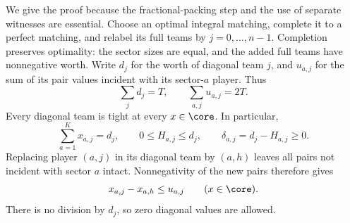 We give the proof because the fractional-packing step and the use of
separate witnesses are essential. Choose an optimal integral matching,
complete it to a perfect matching, and relabel its full teams by
$j=0,\ldots,n-1$. Completion preserves optimality: the sector sizes are
equal, and the added full teams have nonnegative worth. Write $d_j$ for
the worth of diagonal team $j$, and $u_{a,j}$ for the sum of its pair
values incident with its sector-$a$ player. Thus
\begin{equation}\label{four:budgets}
       \sum_j d_j=T,\qquad \sum_{a,j}u_{a,j}=2T.
\end{equation}
Every diagonal team is tight at every $x\in\core$. In particular,
\[
   \sum_{a=1}^Kx_{a,j}=d_j,\qquad
   0\le H_{a,j}\le d_j,\qquad
   \delta_{a,j}=d_j-H_{a,j}\ge0.
\]
Replacing player $(a,j)$ in its diagonal team by $(a,h)$ leaves all
pairs not incident with sector $a$ intact. Nonnegativity of the new
pairs therefore gives
\begin{equation}\label{four:range}
             x_{a,j}-x_{a,h}\le u_{a,j}
             \qquad(x\in\core).
\end{equation}
There is no division by $d_j$, so zero diagonal values are allowed.

